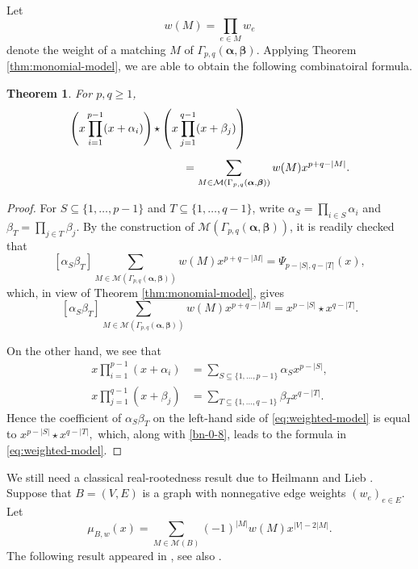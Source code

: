 \documentclass[12pt,a4paper,reqno]{amsart}
\numberwithin{equation}{section}
\newtheorem{theorem}{Theorem}[section]
\theoremstyle{definition}
\theoremstyle{remark}
\newcommand{\Match}{\mathcal M}
\begin{document}
Let
\[
w(M)=\prod_{e\in M}w_e
\]
denote the weight of  a matching  $M$ of $\Gamma_{p,q}(\boldsymbol\alpha,\boldsymbol\beta)$. Applying    Theorem \ref{thm:monomial-model}, we are able to obtain the following combinatoiral formula. 

\begin{theorem}\label{thm:weighted-model}
For $p,q\geq 1$,
\begin{align}
\left(x\prod_{i=1}^{p-1}(x+\alpha_i)\right)\star
   &\left(x\prod_{j=1}^{q-1}(x+\beta_j)\right)\notag\\[5pt]
 &\qquad=
 \sum_{M\in\Match(\Gamma_{p,q}(\boldsymbol\alpha,\boldsymbol\beta))}
 w(M)x^{p+q-|M|}.
 \label{eq:weighted-model}
\end{align}
\end{theorem}



\begin{proof}
For $S\subseteq \{1,\ldots, p-1\}$ and $T\subseteq \{1,\ldots, q-1\}$, write
$\alpha_S=\prod_{i\in S}\alpha_i$ and
$\beta_T=\prod_{j\in T}\beta_j$. 
By the construction of $\Match(\Gamma_{p,q}(\boldsymbol\alpha,\boldsymbol\beta))$, it is readily checked that 
\[
 [\alpha_S\beta_T]
 \sum_{M\in\Match(\Gamma_{p,q}(\boldsymbol\alpha,\boldsymbol\beta))} w(M)x^{p+q-|M|}
 =\Psi_{p-|S|,q-|T|}(x),
\]
which, in view of Theorem \ref{thm:monomial-model}, gives 
\begin{equation}\label{bn-0-8}
 [\alpha_S\beta_T]
 \sum_{M\in\Match(\Gamma_{p,q}(\boldsymbol\alpha,\boldsymbol\beta))} w(M)x^{p+q-|M|}
 =x^{p-|S|}\star x^{q-|T|}.
\end{equation}

 

On the other hand, we see that
\begin{align*}
 x\prod_{i=1}^{p-1}(x+\alpha_i)
   &=\sum_{S\subseteq\{1,\ldots, p-1\}}\alpha_Sx^{p-|S|},\\
 x\prod_{j=1}^{q-1}(x+\beta_j)
   &=\sum_{T\subseteq\{1,\ldots, q-1\}}\beta_Tx^{q-|T|}.
\end{align*}
Hence  the coefficient of
$\alpha_S\beta_T$ on the left-hand side of \eqref{eq:weighted-model} is equal to $x^{p-|S|}\star x^{q-|T|},$ which, along with 
\eqref{bn-0-8}, leads to the formula in  \eqref{eq:weighted-model}. 
\end{proof}

We still need a classical  real-rootedness result due to  Heilmann and Lieb \cite{HL72}.
Suppose that $B=(V,E)$ is a   graph with nonnegative edge weights $(w_e)_{e\in E}$.
Let
\begin{equation*}
 \mu_{B,w}(x)=\sum_{M\in\Match(B)}
 (-1)^{|M|}w(M)x^{|V|-2|M|}.
\end{equation*}
The following result appeared  in \cite[Theorem 4.2]{HL72}, see also  \cite[Theorem 2.2 and Remark~2.3]{Amini19}. 
 
\end{document}
